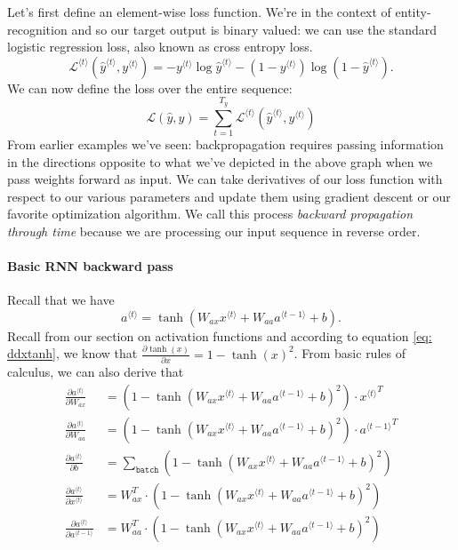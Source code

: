 \documentclass[12pt]{article}
\begin{document}
Let's first define an element-wise loss function. We're in the context of entity-recognition and so our target output is binary valued: we can use the standard logistic regression loss, also known as cross entropy loss.
\[
\mathcal L^{\langle t \rangle} \left( \hat y^{\langle t \rangle}, y^{\langle t \rangle}\right) = -y^{\langle t \rangle} \log \hat y^{\langle t \rangle} - (1-y^{\langle t \rangle}) \log (1 - \hat y^{\langle t \rangle}).
\]
We can now define the loss over the entire sequence:
\[
\mathcal L(\hat y, y) = \sum_{t=1}^{T_y} \mathcal L^{\langle t \rangle} \left( \hat y^{\langle t \rangle}, y^{\langle t \rangle}\right)
\]
From earlier examples we've seen: backpropagation requires passing information in the directions opposite to what we've depicted in the above graph when we pass weights forward as input. We can take derivatives of our loss function with respect to our various parameters and update them using gradient descent or our favorite optimization algorithm. We call this process \emph{backward propagation   through time} because we are processing our input sequence in reverse order.

\paragraph{Basic RNN backward pass} Recall that we have
\[
  a^{\langle t \rangle} = \tanh \left( W_{ax} x^{\langle t \rangle} + W_{aa} a^{\langle t -1 \rangle} + b \right).
\]
Recall from our section on activation functions and according to equation \ref{eq: ddxtanh}, we know that $\frac{\partial \tanh (x)}{\partial x} = 1 - \tanh(x)^2$. From basic rules of calculus, we can also derive that
\begin{align*}
  \frac{\partial a^{\langle t \rangle}}{\partial W_{ax}} &= \left(1 - \tanh \left(W_{ax} x^{\langle t \rangle} + W_{aa} a^{\langle t -1 \rangle} + b   \right)^2 \right) \cdot {x^{\langle t \rangle}}^T \\
    \frac{\partial a^{\langle t \rangle}}{\partial W_{aa}} &= \left(1 - \tanh \left(W_{ax} x^{\langle t \rangle} + W_{aa} a^{\langle t -1 \rangle} + b   \right)^2 \right) \cdot {a^{\langle t-1 \rangle}}^T \\
  \frac{\partial a^{\langle t \rangle}}{\partial b} &= \sum_{\texttt{batch}} \left(1 - \tanh \left(W_{ax}x^{\langle t \rangle} + W_{aa} a^{\langle t - 1     \rangle} + b\right)^2\right) \\
  \frac{\partial a^{\langle t \rangle}}{\partial x^{\langle t \rangle}} &= W_{ax}^T \cdot \left(1 - \tanh\left(W_{ax} x^{\langle t \rangle} + W_{aa}   a^{\langle t - 1 \rangle} + b \right)^2\right) \\
    \frac{\partial a^{\langle t \rangle}}{\partial a^{\langle t-1 \rangle}} &= W_{aa}^T \cdot \left(1 - \tanh\left(W_{ax} x^{\langle t \rangle} + W_{aa} a^{\langle t - 1 \rangle} + b \right)^2\right)
\end{align*}
\end{document}
